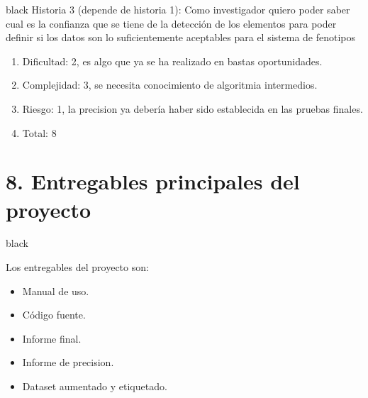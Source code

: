 \documentclass[
11pt, %
]{charter}
\begin{document}
\begin{consigna}{black}
Historia 3 (depende de historia 1):
Como investigador quiero poder saber cual es la confianza que se tiene de la detección de los elementos para poder definir si los datos son lo suficientemente aceptables para el sistema de fenotipos
\begin{enumerate}
	\item Dificultad: 2, es algo que ya se ha realizado en bastas oportunidades.
	\item Complejidad: 3, se necesita conocimiento de algoritmia intermedios.
	\item Riesgo: 1, la precision ya debería haber sido establecida en las pruebas finales.
	\item Total: 8
\end{enumerate}

\end{consigna}

\section{8. Entregables principales del proyecto}
\label{sec:entregables}

\begin{consigna}{black}

Los entregables del proyecto son:

\begin{itemize}
	\item Manual de uso.
	\item Código fuente.
	\item Informe final.
	\item Informe de precision.
	\item Dataset aumentado y etiquetado.
\end{itemize}

\end{consigna}
\end{document}
